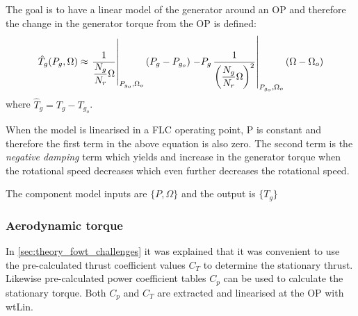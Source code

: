 The goal is to have a linear model of the generator around an OP and therefore the change in the generator torque from the OP is defined:
\begin{equation}
	\hat T_g(P_g, \Omega) \approx \left. \dfrac{1}{\dfrac{N_g}{N_r} \Omega} \right |_{P_{g_o},\Omega_o} (P_g - P_{g_o}) \\ 
	\left. - P_g \, \dfrac{1}{\left( \dfrac{N_g}{N_r} \Omega \right)^2} \right |_{P_{g_o},\Omega_o} (\Omega - \Omega_o)
\end{equation}
where $ \hat T_g = T_g - T_{g_o} $.

When the model is linearised in a FLC operating point, P is constant and therefore the first term in the above equation is also zero. The second term is the \textit{negative damping} term which yields and increase in the generator torque when the rotational speed decreases which even further decreases the rotational speed.

The component model inputs are $ \{P, \Omega\} $ and the output is $ \{T_g\} $


%
%


\subsubsection{Aerodynamic torque} \label{sec:comp_aero_torque}
In \cref{sec:theory_fowt_challenges} it was explained that it was convenient to use the pre-calculated thrust coefficient values $ C_T $ to determine the stationary thrust. Likewise pre-calculated power coefficient tables $ C_p $ can be used to calculate the stationary torque. Both $ C_p $ and $ C_T $ are extracted and linearised at the OP with wtLin.

